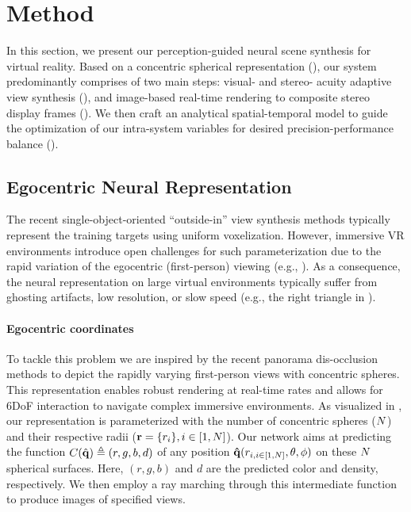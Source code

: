 \section{Method}
\label{sec:method}
In this section, we present our perception-guided neural scene synthesis for virtual reality. Based on a concentric spherical representation (), our system predominantly comprises of two main steps: visual- and stereo- acuity adaptive view synthesis (), and image-based real-time rendering to composite stereo display frames ().
We then craft an analytical spatial-temporal model to guide the optimization of our intra-system variables for desired precision-performance balance ().

\subsection{Egocentric Neural Representation}
\label{sec:method:representation}
The recent single-object-oriented ``outside-in'' view synthesis methods \cite{sitzmann2019deepvoxels,mildenhall2020nerf} typically represent the training targets using uniform voxelization. However, immersive VR environments introduce open challenges for such parameterization due to the rapid variation of the egocentric (first-person) viewing (e.g., ).
As a consequence, the neural representation on large virtual environments typically suffer from ghosting artifacts, low resolution, or slow speed (e.g., the right triangle in ).
\paragraph{Egocentric coordinates}
To tackle this problem we are inspired by the recent panorama dis-occlusion methods \cite{Lin:DeepPanorama,Benjamin:2020:RTV,Broxton:immersiveLF} to depict the rapidly varying first-person views with concentric spheres. This representation enables robust rendering at real-time rates and allows for 6DoF interaction to navigate complex immersive environments. 
As visualized in , our representation is parameterized with the number of concentric spheres ($N$) and their respective radii ($\mathbf{r}=\{r_i\},i\in [1,N]$). Our network aims at predicting the function $C(\hat{\mathbf{q}})\triangleq(r,g,b,d)$ of any position $\mathbf{\hat{\mathbf{q}}}({r_{i,i\in[1,N]},\theta,\phi})$ on these $N$ spherical surfaces. %
Here, $(r,g,b)$ and $d$ are the predicted color and density, respectively. 
We then employ a ray marching through this intermediate function to produce images of specified views.


